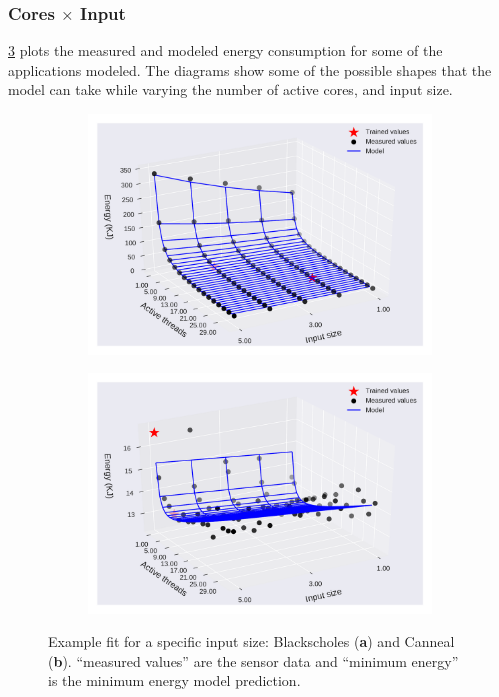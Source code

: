\subsubsection{Cores $\times$ Input}
\cref{fig:en_eq_core_inp_ci} plots the measured and modeled energy consumption for some of the applications modeled. The diagrams  show some of the possible shapes that the model can take while varying the number of active cores, and input size.
\begin{figure}[H]
	\centering
	\captionsetup[subfigure]{justification=centering}
	\begin{subfigure}[b]{0.45\textwidth}
		\centerline{\includegraphics[width=\columnwidth]{models/figures/energy/cores_inps/completo_black_5.pdf}}
		\caption{}
		\label{fig:en_eq_black_ci}
	\end{subfigure}
	\begin{subfigure}[b]{0.45\textwidth}
		\centerline{\includegraphics[width=\columnwidth]{models/figures/energy/cores_inps/completo_canneal_1.pdf}}
		\caption{}
		\label{fig:en_eq_canneal_ci}
	\end{subfigure}
	
	\caption{Example fit for a specific input size: Blackscholes (\textbf{a}) and Canneal (\textbf{b}).  “measured values” are the sensor data and “minimum energy” is the minimum energy model prediction.
	}
	\label{fig:en_eq_core_inp_ci}
\end{figure}


